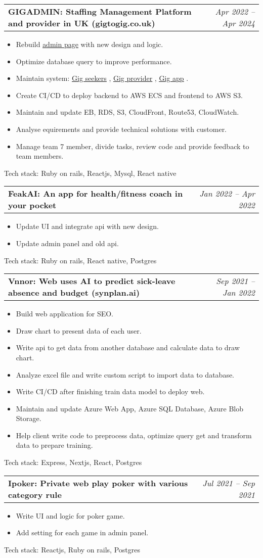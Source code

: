 \documentclass[letterpaper,11pt]{article}
\makeatletter
\newcommand{\resumeItem}[1]{
  \item\small{
    {#1 \vspace{-2pt}}
  }
}
\newcommand{\resumeSubheadingProject}[2]{
  \vspace{-2pt}\item
    \begin{tabular*}{0.97\textwidth}[t]{l@{\extracolsep{\fill}}r}
      \textbf{\small#1} & \textit{\small #2} \\
    \end{tabular*}\vspace{-7pt}
}
\newcommand{\resumeLink}[2]{
  \href{#1}{\underline{#2}}
}
\newcommand{\resumeSubSubheading}[2]{
    \item
    \begin{tabular*}{0.97\textwidth}{l@{\extracolsep{\fill}}r}
      \textit{\small#1} & \textit{\small #2} \\
    \end{tabular*}\vspace{-7pt}
}
\newcommand{\resumeSubHeadingListEnd}{\end{itemize}}
\newcommand{\resumeItemListStart}{\begin{itemize}}
\newcommand{\resumeItemListEnd}{\end{itemize}\vspace{-5pt}}
\makeatother
\begin{document}
\resumeSubheadingProject
{GIGADMIN: Staffing Management Platform and provider in UK (gigtogig.co.uk)}{Apr 2022 -- Apr 2024}
\resumeItemListStart
\resumeItem{ Rebuild\resumeLink{https://www.gigadmin.co.uk/login}{admin page}with new design and logic.}
\resumeItem{ Optimize database query to improve performance.}
\resumeItem{ Maintain system:\resumeLink{https://www.gigseekers.co.uk/main/login/}{Gig seekers},\resumeLink{https://www.gigprovider.co.uk/signin}{Gig provider},\resumeLink{https://play.google.com/store/apps/details?id=com.gigtogig.marketplace}{Gig app}.  }
\resumeItem{ Create CI/CD to deploy backend to AWS ECS and frontend to AWS S3.}
\resumeItem{ Maintain and update EB, RDS, S3, CloudFront, Route53, CloudWatch.}
\resumeItem{ Analyse equirements and provide technical solutions with customer.}
\resumeItem{ Manage team 7 member, divide tasks, review code and provide feedback to team members.}
\resumeItemListEnd
{Tech stack:}{ Ruby on rails, Reactjs, Mysql, React native}

\resumeSubheadingProject
{FeakAI: An app for health/fitness coach in your pocket}{Jan 2022 -- Apr 2022}
\resumeItemListStart
\resumeItem{ Update UI and integrate api with new design.}
\resumeItem{ Update admin panel and old api.}
\resumeItemListEnd
{Tech stack:}{ Ruby on rails, React native, Postgres}

\resumeSubheadingProject
{Vnnor: Web uses AI to predict sick-leave absence and budget (synplan.ai)}{Sep 2021 -- Jan 2022}
\resumeItemListStart
\resumeItem{ Build web application for SEO.}
\resumeItem{ Draw chart to present data of each user.}
\resumeItem{ Write api to get data from another database and calculate data to draw chart.}
\resumeItem{ Analyze excel file and write custom script to import data to database.}
\resumeItem{ Write CI/CD after finishing train data model to deploy web.}
\resumeItem{ Maintain and update Azure Web App, Azure SQL Database, Azure Blob Storage.}
\resumeItem{ Help client write code to preprocess data, optimize query get and transform data to prepare training.}
\resumeItemListEnd
{Tech stack:}{ Express, Nextjs, React, Postgres}

\resumeSubheadingProject
{Ipoker: Private web play poker with various category rule}{Jul 2021 -- Sep 2021}
\resumeItemListStart
\resumeItem{ Write UI and logic for poker game.}
\resumeItem{ Add setting for each game in admin panel.}
\resumeItemListEnd
{Tech stack:}{ Reactjs, Ruby on rails, Postgres}

\end{document}

